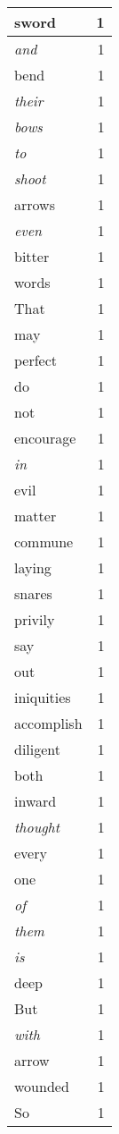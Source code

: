 \begin{center}
\begin{longtable}{l|r}
sword & 1 \\ \hline
\emph{and} & 1 \\ \hline
bend & 1 \\ \hline
\emph{their} & 1 \\ \hline
\emph{bows} & 1 \\ \hline
\emph{to} & 1 \\ \hline
\emph{shoot} & 1 \\ \hline
arrows & 1 \\ \hline
\emph{even} & 1 \\ \hline
bitter & 1 \\ \hline
words & 1 \\ \hline
That & 1 \\ \hline
may & 1 \\ \hline
perfect & 1 \\ \hline
do & 1 \\ \hline
not & 1 \\ \hline
encourage & 1 \\ \hline
\emph{in} & 1 \\ \hline
evil & 1 \\ \hline
matter & 1 \\ \hline
commune & 1 \\ \hline
laying & 1 \\ \hline
snares & 1 \\ \hline
privily & 1 \\ \hline
say & 1 \\ \hline
out & 1 \\ \hline
iniquities & 1 \\ \hline
accomplish & 1 \\ \hline
diligent & 1 \\ \hline
both & 1 \\ \hline
inward & 1 \\ \hline
\emph{thought} & 1 \\ \hline
every & 1 \\ \hline
one & 1 \\ \hline
\emph{of} & 1 \\ \hline
\emph{them} & 1 \\ \hline
\emph{is} & 1 \\ \hline
deep & 1 \\ \hline
But & 1 \\ \hline
\emph{with} & 1 \\ \hline
arrow & 1 \\ \hline
wounded & 1 \\ \hline
So & 1 \\ \hline

\end{longtable}
\end{center}

